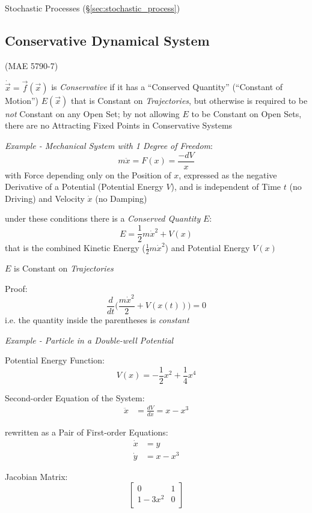 \fist Stochastic Processes (\S\ref{sec:stochastic_process})



\subsection{Conservative Dynamical System}
\label{sec:conservative_dynamical_system}

(MAE 5790-7)

$\dot{\vec{x}} = \vec{f}(\vec{x})$ is \emph{Conservative} if it has a
``Conserved Quantity'' (``Constant of Motion'') $E(\vec{x})$ that is Constant
on \emph{Trajectories}, but otherwise is required to be \emph{not} Constant on
any Open Set;
by not allowing $E$ to be Constant on Open Sets, there are no Attracting Fixed
Points in Conservative Systems

\emph{Example - Mechanical System with 1 Degree of Freedom}:
\[
  m\ddot{x} = F(x) = \frac{-dV}{x}
\]
with Force depending only on the Position of $x$, expressed as the negative
Derivative of a Potential (Potential Energy $V$), and is independent of Time
$t$ (no Driving) and Velocity $\dot{x}$ (no Damping)

under these conditions there is a \emph{Conserved Quantity} $E$:
\[
  E = \frac{1}{2}m\dot{x}^2 + V(x)
\]
that is the combined Kinetic Energy ($\frac{1}{2}m\dot{x}^2$) and Potential
Energy $V(x)$

$E$ is Constant on \emph{Trajectories}

Proof:
\[
  \frac{d}{dt}\Big(\frac{m\dot{x}^2}{2} + V(x(t))\Big) = 0
\]
i.e. the quantity inside the parentheses is \emph{constant}


\emph{Example - Particle in a Double-well Potential}

Potential Energy Function:
\[
  V(x) = -\frac{1}{2}x^2 + \frac{1}{4}x^4
\]

Second-order Equation of the System:
\begin{align*}
  \ddot{x} & = \frac{dV}{dx} = x - x^3
\end{align*}

rewritten as a Pair of First-order Equations:
\begin{align*}
  \dot{x} & = y \\
  \dot{y} & = x - x^3
\end{align*}

Jacobian Matrix:
\[
  \begin{bmatrix}
    0        & 1 \\
    1 - 3x^2 & 0 \\
  \end{bmatrix}
\]

